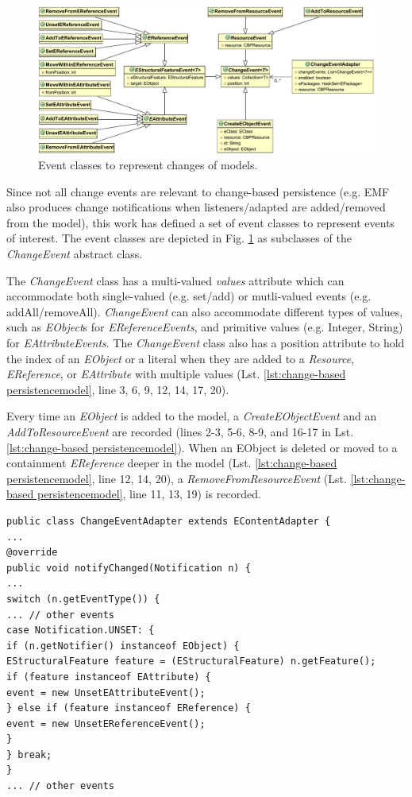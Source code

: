 \documentclass[12pt, a4paper]{report} \usepackage[titletoc]{appendix}
\begin{document}
\begin{figure}[th]
	\centering
	\includegraphics[width=\linewidth]{events}
	\caption{Event classes to represent changes of models.}
	\label{fig:events}
\end{figure}

Since not all change events are relevant to change-based persistence (e.g. EMF also produces change notifications when listeners/adapted are added/removed from the model), this work has defined a set of event classes to represent events of interest. The event classes are depicted in Fig. \ref{fig:events} as subclasses of the \emph{ChangeEvent} abstract class. 

The \emph{ChangeEvent} class has a multi-valued \emph{values} attribute which can accommodate both single-valued (e.g. set/add) or mutli-valued events (e.g. addAll/removeAll). \emph{ChangeEvent} can also accommodate different types of values, such as \emph{EObject}s for \emph{EReferenceEvents}, and primitive values (e.g. Integer, String) for \emph{EAttributeEvents}. The \emph{ChangeEvent} class also has a position attribute to hold the index of an \emph{EObject} or a literal when they are added to a \emph{Resource}, \emph{EReference}, or \emph{EAttribute} with multiple values (Lst. \ref{lst:change-based persistencemodel}, line 3, 6, 9, 12, 14, 17, 20). 

Every time an \emph{EObject} is added to the model, a \emph{CreateEObjectEvent} and an \emph{AddToResourceEvent} are recorded (lines 2-3, 5-6, 8-9, and 16-17 in Lst. \ref{lst:change-based persistencemodel}). When an EObject is deleted or moved to a containment \emph{EReference} deeper in the model (Lst. \ref{lst:change-based persistencemodel}, line 12, 14, 20), a \emph{RemoveFromResourceEvent} (Lst. \ref{lst:change-based persistencemodel}, line 11, 13, 19) is recorded.

\begin{lstlisting}[style=java,caption={Simplified Java code to handle notification events.},label=lst:javacode]
public class ChangeEventAdapter extends EContentAdapter {
...
@override
public void notifyChanged(Notification n) {
...
switch (n.getEventType()) {
... // other events
case Notification.UNSET: {
if (n.getNotifier() instanceof EObject) {
EStructuralFeature feature = (EStructuralFeature) n.getFeature();
if (feature instanceof EAttribute) {
event = new UnsetEAttributeEvent();
} else if (feature instanceof EReference) {
event = new UnsetEReferenceEvent();
}
} break;
} 
... // other events
\end{lstlisting}
\end{document}
